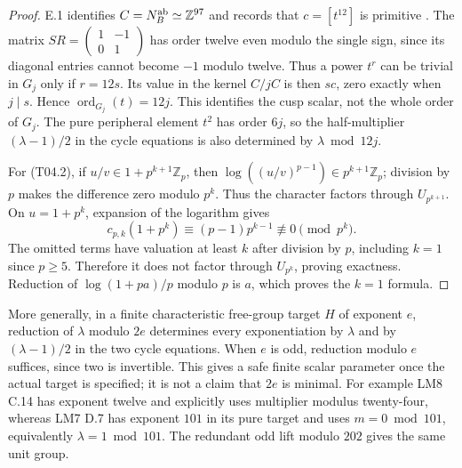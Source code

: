 \begin{proof}
E.1 identifies $C=N_B^{\rm ab}\simeq\mathbb Z^{97}$ and records that
$c=[t^{12}]$ is primitive \cite[E.1, proof; E.4]{LM7run}.
The matrix $SR=\left(\begin{smallmatrix}1&-1\\0&1\end{smallmatrix}\right)$
has order twelve even modulo the single sign, since its diagonal
entries cannot become $-1$ modulo twelve. Thus a power $t^r$ can be trivial
in $G_j$ only if $r=12s$. Its value in the kernel $C/jC$ is then
$sc$, zero exactly when $j\mid s$. Hence $\operatorname{ord}_{G_j}(t)=12j$.
This identifies the cusp scalar, not the whole order of $G_j$.
The pure peripheral element $t^2$ has order $6j$, so the half-multiplier
$(\lambda-1)/2$ in the cycle equations is also determined by
$\lambda\bmod12j$.

For (T04.2), if $u/v\in1+p^{k+1}\mathbb Z_p$, then
$\log((u/v)^{p-1})\in p^{k+1}\mathbb Z_p$; division by $p$ makes
the difference zero modulo $p^k$. Thus the character factors through
$U_{p^{k+1}}$. On $u=1+p^k$, expansion of the logarithm gives
\[
 c_{p,k}(1+p^k)\equiv(p-1)p^{k-1}\not\equiv0\pmod{p^k}.
\]
The omitted terms have valuation at least $k$ after division by $p$,
including $k=1$ since $p\geq5$. Therefore it does not factor through
$U_{p^k}$, proving exactness. Reduction of
$\log(1+pa)/p$ modulo $p$ is $a$, which proves the $k=1$ formula.
\end{proof}

More generally, in a finite characteristic free-group target $H$ of
exponent $e$, reduction of $\lambda$ modulo $2e$ determines every
exponentiation by $\lambda$ and by $(\lambda-1)/2$ in the two cycle equations.
When $e$ is odd, reduction modulo $e$ suffices, since two is invertible.
This gives a safe finite scalar parameter once the actual target is
specified; it is not a claim that $2e$ is minimal. For example LM8
C.14 has exponent twelve and explicitly uses multiplier modulus
twenty-four, whereas LM7 D.7 has exponent $101$ in its pure target
and uses $m=0\bmod101$, equivalently $\lambda=1\bmod101$.
The redundant odd lift modulo $202$ gives the same unit group.

